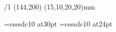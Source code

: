 \chyph  %





\margins/1 (144,200) (15,10,20,20)mm

\typosize[10/15]

\def\pagenumbers{\footline{\hss\tenrm\folio\hss}}
\def\picdir {./Obrazky/}

\font\nadpis=csssdc10  at30pt
\font\telo=csssdc10  at24pt
